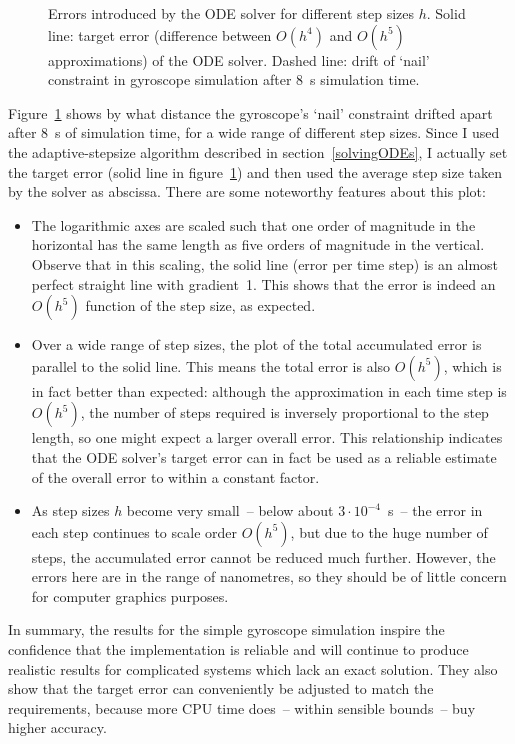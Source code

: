 \begin{figure}
\centerline{}
\caption{Errors introduced by the ODE solver for different step sizes $h$.
    Solid line: target error (difference between $O(h^4)$ and $O(h^5)$ approximations) of
    the ODE solver. Dashed line: drift of `nail' constraint in gyroscope simulation after
    8~s simulation time.\label{errorplot}}
\end{figure}

Figure~\ref{errorplot} shows by what distance the gyroscope's `nail' constraint drifted apart
after 8~s of simulation time, for a wide range of different step sizes. Since I used the
adaptive-stepsize algorithm described in section~\ref{solvingODEs}, I actually set the target
error (solid line in figure~\ref{errorplot}) and then used the average step size taken by the
solver as abscissa. There are some noteworthy features about this plot:

\begin{itemize}
\item The logarithmic axes are scaled such that one order of magnitude in the horizontal has the
    same length as five orders of magnitude in the vertical. Observe that in this scaling, the
    solid line (error per time step) is an almost perfect straight line with gradient~1. This
    shows that the error is indeed an $O(h^5)$ function of the step size, as expected.
\item Over a wide range of step sizes, the plot of the total accumulated error is parallel to the
    solid line. This means the total error is also $O(h^5)$, which is in fact better than
    expected: although the approximation in each time step is $O(h^5)$, the number of steps
    required is inversely proportional to the step length, so one might expect a larger overall
    error. This relationship indicates that the ODE solver's target error can in fact be used
    as a reliable estimate of the overall error to within a constant factor.
\item As step sizes $h$ become very small~-- below about $3\cdot 10^{-4}$~s~-- the error in each
    step continues to scale order $O(h^5)$, but due to the huge number of steps, the accumulated
    error cannot be reduced much further. However, the errors here are in the range of nanometres,
    so they should be of little concern for computer graphics purposes.
\end{itemize}

In summary, the results for the simple gyroscope simulation inspire the confidence that the
implementation is reliable and will continue to produce realistic results for complicated systems
which lack an exact solution. They also show that the target error can conveniently be adjusted
to match the requirements, because more CPU time does~-- within sensible bounds~-- buy higher
accuracy.


